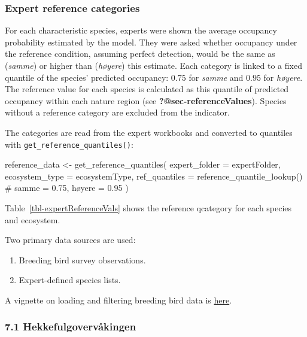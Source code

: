 \documentclass[
  letterpaper,
  DIV=11,
  numbers=noendperiod]{scrartcl}
\newenvironment{Shaded}{\begin{snugshade}}{\end{snugshade}}
\newcommand{\AttributeTok}[1]{\textcolor[rgb]{0.40,0.45,0.13}{#1}}
\newcommand{\CommentTok}[1]{\textcolor[rgb]{0.37,0.37,0.37}{#1}}
\newcommand{\FunctionTok}[1]{\textcolor[rgb]{0.28,0.35,0.67}{#1}}
\newcommand{\NormalTok}[1]{\textcolor[rgb]{0.00,0.23,0.31}{#1}}
\newcommand{\OtherTok}[1]{\textcolor[rgb]{0.00,0.23,0.31}{#1}}
\providecommand{\tightlist}{%
  \setlength{\itemsep}{0pt}\setlength{\parskip}{0pt}}
\begin{document}
\subsubsection{Expert reference
categories}\label{expert-reference-categories}

For each characteristic species, experts were shown the average
occupancy probability estimated by the model. They were asked whether
occupancy under the reference condition, assuming perfect detection,
would be the same as (\emph{samme}) or higher than (\emph{høyere}) this
estimate. Each category is linked to a fixed quantile of the species'
predicted occupancy: \(0.75\) for \emph{samme} and \(0.95\) for
\emph{høyere}. The reference value for each species is calculated as
this quantile of predicted occupancy within each nature region (see
\textbf{?@sec-referenceValues}). Species without a reference category
are excluded from the indicator.

The categories are read from the expert workbooks and converted to
quantiles with \texttt{get\_reference\_quantiles()}:

\begin{Shaded}
\begin{Highlighting}[]
\NormalTok{reference\_data }\OtherTok{\textless{}{-}} \FunctionTok{get\_reference\_quantiles}\NormalTok{(}
  \AttributeTok{expert\_folder  =}\NormalTok{ expertFolder,}
  \AttributeTok{ecosystem\_type =}\NormalTok{ ecosystemType,}
  \AttributeTok{ref\_quantiles  =} \FunctionTok{reference\_quantile\_lookup}\NormalTok{() }\CommentTok{\# samme = 0.75, høyere = 0.95}
\NormalTok{)}
\end{Highlighting}
\end{Shaded}

Table~\ref{tbl-expertReferenceVals} shows the reference qcategory for
each species and ecosystem.

Two primary data sources are used:

\begin{enumerate}
\def\labelenumi{\arabic{enumi}.}
\tightlist
\item
  Breeding bird survey observations.
\item
  Expert-defined species lists.
\end{enumerate}

A vignette on loading and filtering breeding bird data is
\href{https://github.com/NINAnor/breedingBirdIndicator_OccupancyModelling/blob/main/vignettes/data_preparation.qmd}{here}.

\subsubsection{7.1
Hekkefulgovervåkingen}\label{hekkefulgovervuxe5kingen}
\end{document}
